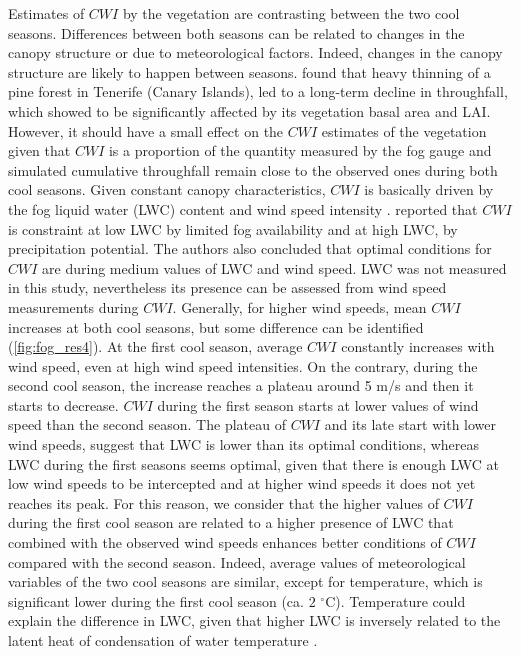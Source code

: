 \documentclass[a4paper,12pt]{article}
\begin{document}
\begin{linenumbers}
Estimates of $CWI$ by the vegetation are contrasting between the two cool seasons. Differences between both seasons can be related to changes in the canopy structure or due to meteorological factors. Indeed, changes in the canopy structure are likely to happen between seasons. \cite{Aboaletal2000} found that heavy thinning of a pine forest in Tenerife (Canary Islands), led to a long-term decline in throughfall, which showed to be significantly affected by its vegetation basal area and LAI. However, it should have a small effect on the $CWI$ estimates of the vegetation given that $CWI$ is a proportion of the quantity measured by the fog gauge and simulated cumulative throughfall remain close to the observed ones during both cool seasons. Given constant canopy characteristics, $CWI$ is basically driven by the fog liquid water (LWC) content and wind speed intensity \citep{Villegasetal2008}. \cite{Villegasetal2008} reported that $CWI$ is constraint at low LWC by limited fog availability and at high LWC, by precipitation potential. The authors also concluded that optimal conditions for $CWI$ are during medium values of LWC and wind speed. LWC was not measured in this study, nevertheless its presence can be assessed from wind speed measurements during $CWI$. Generally, for higher wind speeds, mean $CWI$ increases at both cool seasons, but some difference can be identified (\autoref{fig:fog_res4}). At the first cool season, average $CWI$ constantly increases with wind speed, even at high wind speed intensities. On the contrary, during the second cool season, the increase reaches a plateau around 5 m/s and then it starts to decrease. $CWI$ during the first season starts at lower values of wind speed than the second season. The plateau of $CWI$ and its late start with lower wind speeds, suggest that LWC is lower than its optimal conditions, whereas LWC during the first seasons seems optimal, given that there is enough LWC at low wind speeds to be intercepted and at higher wind speeds it does not yet reaches its peak. For this reason, we consider that the higher values of $CWI$ during the first cool season are related to a higher presence of LWC that combined with the observed wind speeds enhances better conditions of $CWI$ compared with the second season. Indeed, average values of meteorological variables of the two cool seasons are similar, except for temperature, which is significant lower during the first cool season (ca. $2$ $\mathrm{^{\circ}C}$). Temperature could explain the difference in LWC, given that higher LWC is inversely related to the latent heat of condensation of water temperature \citep{Thompson2007}.





\end{linenumbers}
\end{document}
